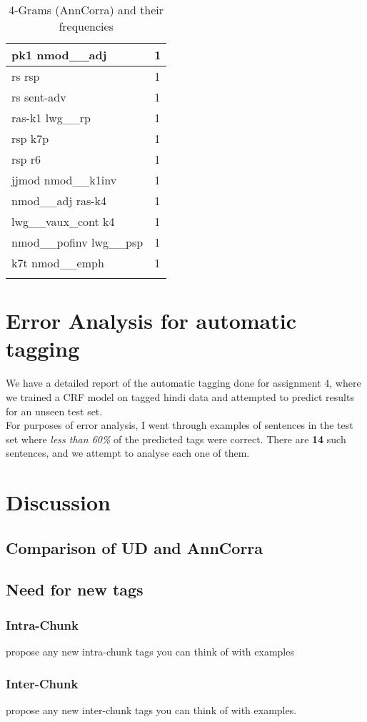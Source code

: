 \documentclass[a4 paper]{article}
\begin{document}
\begin{longtable}{p{}p{}}
pk1 nmod\_\_adj  & 1 \\ \midrule
rs rsp  & 1 \\ \midrule
rs sent-adv  & 1 \\ \midrule
ras-k1 lwg\_\_rp  & 1 \\ \midrule
rsp k7p  & 1 \\ \midrule
rsp r6  & 1 \\ \midrule
jjmod nmod\_\_k1inv  & 1 \\ \midrule
nmod\_\_adj ras-k4  & 1 \\ \midrule
lwg\_\_vaux\_cont k4  & 1 \\ \midrule
nmod\_\_pofinv lwg\_\_psp  & 1 \\ \midrule
k7t nmod\_\_emph  & 1 \\ \midrule
    \caption{4-Grams (AnnCorra) and their frequencies}
\label{tab:ngram4ann}
\end{longtable}
    




\section{Error Analysis for automatic tagging}
We have a detailed report of the automatic tagging done for assignment 4,
where we trained a CRF model on tagged hindi data and attempted to predict 
results for an unseen test set.\\
For purposes of error analysis, I went through examples of sentences in the 
test set where \textit{less than 60\%} of the predicted tags were correct. There
are \textbf{14} such sentences, and we attempt to analyse each one of them.

\section{Discussion}

\subsection{Comparison of UD and AnnCorra}
\subsection{Need for new tags}
\subsubsection{Intra-Chunk}
propose any new intra-chunk tags you can think of with examples
\subsubsection{Inter-Chunk}
propose any new inter-chunk tags you can think of with examples.
\end{document}
